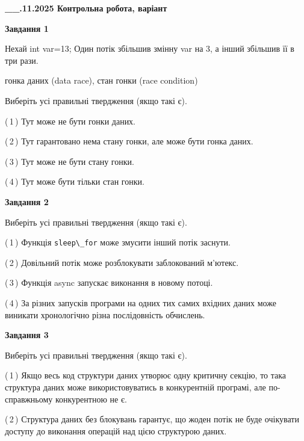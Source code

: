 \documentclass[12pt, ukrainian]{article}
\def\code#1{\Verb!#1!}
\begin{document}
\begin {large}

\textbf{\_\_.11.2025 Контрольна робота, варіант  }\par


{

\begin{center}
\textbf{Завдання 1}
\end{center}
Нехай int var=13; Один потік збільшив змінну var на 3, а інший збільшив її в три рази.

гонка даних (data race), стан гонки (race condition)

Виберіть усі правильні твердження (якщо такі є).\par
\vspace{2mm}
(\,1\,) Тут може не бути гонки даних.%

(\,2\,) Тут гарантовано нема стану гонки, але може бути гонка даних.%

(\,3\,) Тут може не бути стану гонки.%

(\,4\,) Тут може бути тільки стан гонки.%



\begin{center}
\textbf{Завдання 2}
\end{center}
Виберіть усі правильні твердження (якщо такі є).\par
\vspace{2mm}

(\,1\,) Функція \code{sleep\_for} може змусити інший потік заснути.%

(\,2\,) Довільний потік може розблокувати заблокований м’ютекс.%

(\,3\,) Функція async запускає виконання в новому потоці.%

(\,4\,) За різних запусків програми на одних тих самих вхідних даних може виникати хронологічно різна послідовність обчислень.%



\begin{center}
\textbf{Завдання 3}
\end{center}
Виберіть усі правильні твердження (якщо такі є).\par
\vspace{2mm}

(\,1\,) Якщо весь код структури даних утворює одну критичну секцію, то така структура даних може використовуватись в конкурентній програмі, але по-справжньо\-му конкурентною не є.%

(\,2\,) Структура даних без блокувань гарантує, що жоден потік не буде очікувати доступу до виконання операцій над цією структурою даних.%

}
\end{large}
\end{document}
